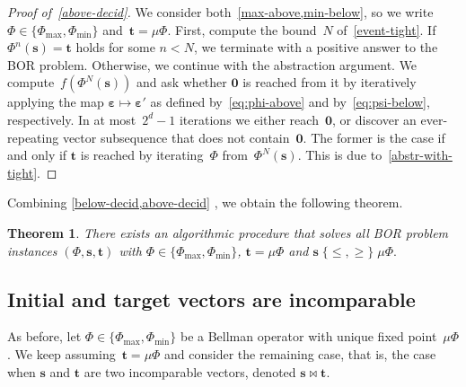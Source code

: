 \documentclass[preprint,12pt]{elsarticle}
\theoremstyle{plain}
\newtheorem{theorem}{Theorem}[section]
\theoremstyle{definition}
\theoremstyle{remark}
\theoremstyle{claimstyle}
\newcommand{\eps}{\bm{\varepsilon}}
\begin{document}
\begin{proof}[Proof of~\cref{above-decid}]
We consider both~\cref{max-above,min-below}, so we write~$\Phi \in \{\Phi_{\max},\Phi_{\min}\}$ and~$\bm{t} = \mu\Phi$.
	First, compute the bound~$N$ of~\cref{event-tight}.
If $\Phi^n(\bm{s}) = \bm{t}$ holds for some $n < N$, we terminate with a positive answer to the BOR problem.
Otherwise, we continue with the abstraction argument.
We compute~$f(\Phi^N(\bm{s}))$ and ask whether $\bm{0}$ is reached from it by iteratively applying the map $\eps \mapsto \eps'$ as defined by~\cref{eq:phi-above} and by~\cref{eq:psi-below}, respectively. 
In at most~$2^d - 1$ iterations we either reach~$\bm{0}$,
or discover an ever-repeating vector subsequence that does not contain~$\bm{0}$.
The former is the case if and only if $\bm{t}$ is reached by iterating~$\Phi$ from~$\Phi^N(\bm{s})$. This is due to~\cref{abstr-with-tight}.
\end{proof}
Combining \cref{below-decid,above-decid}%
, we obtain the following theorem.
\begin{theorem}\label{compar-decid}
There exists an algorithmic procedure that solves all BOR problem instances $(\Phi, \bm{s}, \bm{t})$ with
$\Phi \in \{\Phi_{\max},\Phi_{\min}\}$,
$\bm{t} = \mu\Phi$
and %
\(\bm{s} \; \{\leq, \geq\} \; \mu\Phi.\)
\end{theorem}
\subsection{Initial and target vectors are incomparable}
\label{sec:incomp}
As before, let $\Phi \in \{\Phi_{\max}, \Phi_{\min}\}$ be a Bellman operator with unique fixed point~$\mu\Phi$.
We keep assuming~$\bm{t}= \mu\Phi$ and consider the remaining case, that is, the case when $\bm{s}$ and $\bm{t}$ are two incomparable vectors,
denoted $\bm{s} \bowtie \bm{t}$.
\end{document}
